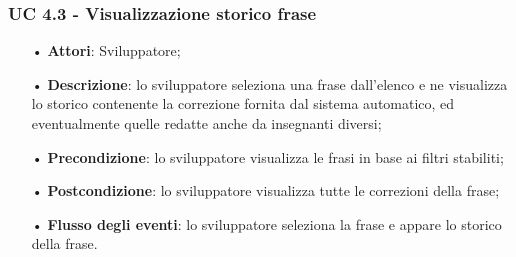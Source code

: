   
\subsubsection{UC 4.3 - Visualizzazione storico frase}
\begin{itemize}
\item[•]\textbf{Attori}: Sviluppatore;
\item[•]\textbf{Descrizione}: lo sviluppatore seleziona una frase dall'elenco e ne visualizza lo storico contenente la correzione fornita dal sistema automatico, ed eventualmente quelle redatte anche da insegnanti diversi;
\item[•]\textbf{Precondizione}: lo sviluppatore visualizza le frasi in base ai filtri stabiliti;
\item[•]\textbf{Postcondizione}: lo sviluppatore visualizza tutte le correzioni della frase;
\item[•]\textbf{Flusso degli eventi}: lo sviluppatore seleziona la frase e appare lo storico della frase.
\end{itemize}

